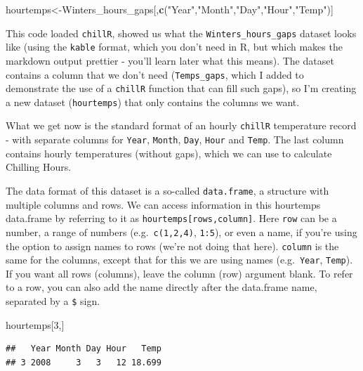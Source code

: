 \documentclass[
]{book}
\newenvironment{Shaded}{\begin{snugshade}}{\end{snugshade}}
\newcommand{\DecValTok}[1]{\textcolor[rgb]{0.00,0.00,0.81}{#1}}
\newcommand{\KeywordTok}[1]{\textcolor[rgb]{0.13,0.29,0.53}{\textbf{#1}}}
\newcommand{\NormalTok}[1]{#1}
\newcommand{\StringTok}[1]{\textcolor[rgb]{0.31,0.60,0.02}{#1}}
\begin{document}
\begin{Shaded}
\begin{Highlighting}[]
\NormalTok{hourtemps<-Winters_hours_gaps[,}\KeywordTok{c}\NormalTok{(}\StringTok{"Year"}\NormalTok{,}\StringTok{"Month"}\NormalTok{,}\StringTok{"Day"}\NormalTok{,}\StringTok{"Hour"}\NormalTok{,}\StringTok{"Temp"}\NormalTok{)]}
\end{Highlighting}
\end{Shaded}

This code loaded \texttt{chillR}, showed us what the \texttt{Winters\_hours\_gaps} dataset looks like (using the \texttt{kable} format, which you don't need in R, but which makes the markdown output prettier - you'll learn later what this means). The dataset contains a column that we don't need (\texttt{Temps\_gaps}, which I added to demonstrate the use of a \texttt{chillR} function that can fill such gaps), so I'm creating a new dataset (\texttt{hourtemps}) that only contains the columns we want.

What we get now is the standard format of an hourly \texttt{chillR} temperature record - with separate columns for \texttt{Year}, \texttt{Month}, \texttt{Day}, \texttt{Hour} and \texttt{Temp}. The last column contains hourly temperatures (without gaps), which we can use to calculate Chilling Hours.

The data format of this dataset is a so-called \texttt{data.frame}, a structure with multiple columns and rows. We can access information in this hourtemps data.frame by referring to it as \texttt{hourtemps{[}rows,column{]}}. Here \texttt{row} can be a number, a range of numbers (e.g.~\texttt{c(1,2,4)}, \texttt{1:5}), or even a name, if you're using the option to assign names to rows (we're not doing that here). \texttt{column} is the same for the columns, except that for this we are using names (e.g.~\texttt{Year}, \texttt{Temp}). If you want all rows (columns), leave the column (row) argument blank. To refer to a row, you can also add the name directly after the data.frame name, separated by a \texttt{\$} sign.

\begin{Shaded}
\begin{Highlighting}[]
\NormalTok{hourtemps[}\DecValTok{3}\NormalTok{,]}
\end{Highlighting}
\end{Shaded}

\begin{verbatim}
##   Year Month Day Hour   Temp
## 3 2008     3   3   12 18.699
\end{verbatim}
\end{document}
